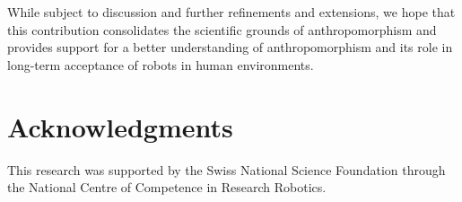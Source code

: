 \documentclass{frontiersSCNS} %
\begin{document}
While subject to discussion and further refinements and extensions, we hope that
this contribution consolidates the scientific grounds of anthropomorphism and
provides support for a better understanding of anthropomorphism and its role in
long-term acceptance of robots in human environments.




\section*{Acknowledgments}

This research was supported by the Swiss National Science Foundation through the
National Centre of Competence in Research Robotics.

\end{document}
